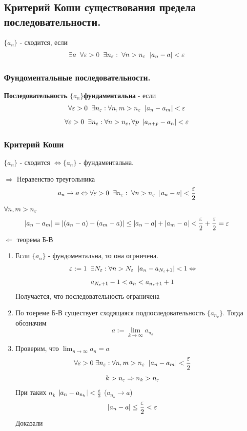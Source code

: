 \subsection{Критерий Коши существования предела последовательности.}

$\{a_n\}$ - сходится, если
\[ \exists a\;\; \forall \varepsilon > 0\;\; \exists n_\varepsilon:\; \forall n > n_\varepsilon\;\; |a_n - a| < \varepsilon \]

\subsubsection*{Фундоментальные последовательности.}
\begin{tcolorbox}
    \textbf{Последовательность $\{a_n\} $фундаментальна} - если
    \[\forall \varepsilon>0 \;\; \exists n_\varepsilon : \forall n, m > n_\varepsilon \;\; |a_n-a_m| < \varepsilon\]
    \[ \forall \varepsilon>0 \;\; \exists n_\varepsilon : \forall n > n_\varepsilon,\forall  p \;\; |a_{n+p}-a_n| < \varepsilon \]
\end{tcolorbox}

\subsubsection*{Критерий Коши}
\begin{tcolorbox}
    $\{a_n\}$ - сходится $\Leftrightarrow \{a_n\}$ - фундаментальна.
\end{tcolorbox}

\begin{tcolorbox}[title=Доказательство]
    $\Rightarrow$ Неравенство треугольника 
    \[ a_n \to a \Leftrightarrow \forall \varepsilon > 0\;\; \exists n_\varepsilon:\; \forall n > n_\varepsilon\;\; |a_n - a| < \frac{\varepsilon}{2} \]
    $\forall n, m > n_\varepsilon$
\[ |a_n - a_m| = |(a_n - a) - (a_m - a)| \leq |a_n - a| + |a_m - a| < \frac{\varepsilon}{2} + \frac{\varepsilon}{2} = \varepsilon \]
    $\Leftarrow$ теорема Б-В 
    \begin{enumerate}
	    \item Если $\{a_n\}$ - фундоментальна, то она огрничена. 
		    \[ \varepsilon := 1\;\; \exists N_\varepsilon: \forall n > N_\varepsilon\;\; |a_n - a_{N_\varepsilon + 1}| < 1 \Leftrightarrow \]
		    \[ a_{N_\varepsilon + 1} - 1 < a_n < a_{n_\varepsilon + 1} + 1  \]
		    Получается, что последовательность ограничена
	    \item По тоереме Б-В существует сходящаяся подпоследовательность $\{a_{n_k}\}$. Тогда обозначим
		    \[ a:= \lim_{k\to \infty} a_{n_k} \]
	    \item Проверим, что $\lim_{n\to \infty} a_{n} = a$\\
		    \[ \forall \varepsilon > 0\; \exists n_\varepsilon: \forall n,m > n_\varepsilon \;\; |a_n - a_m| < \frac{\varepsilon}{2}  \]
		    \[ k > n_\varepsilon \Rightarrow n_k > n_\varepsilon \]
		    При таких $n_k$ $|a_n - a_{n_k}| < \frac{\varepsilon}{2}$  ($a_{n_k} \to a$)
		    \[ |a_n - a| \leq \frac{\varepsilon}{2} < \varepsilon \]
		    Доказали
    \end{enumerate}
\end{tcolorbox}


